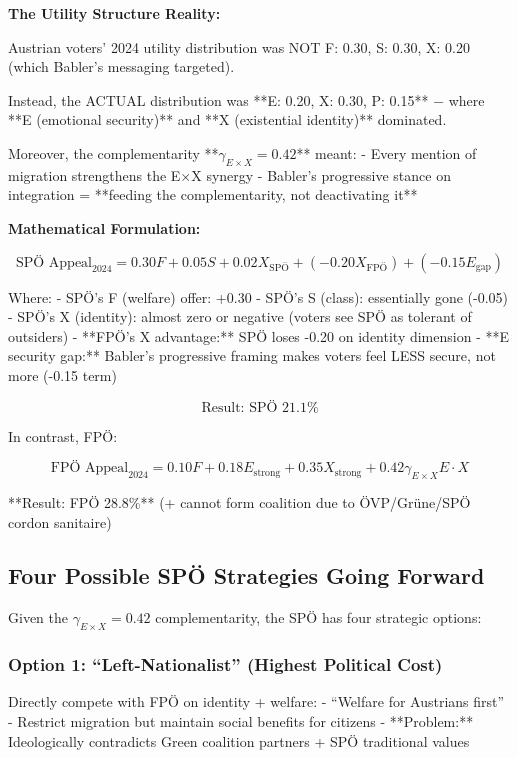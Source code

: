 \textbf{The Utility Structure Reality:}

Austrian voters' 2024 utility distribution was NOT {F: 0.30, S: 0.30, X: 0.20} (which Babler's messaging targeted).

Instead, the ACTUAL distribution was {**E: 0.20, X: 0.30, P: 0.15**} − where **E (emotional security)** and **X (existential identity)** dominated.

Moreover, the complementarity **$\gamma_{E \times X} = 0.42$** meant:
- Every mention of migration strengthens the E×X synergy
- Babler's progressive stance on integration = **feeding the complementarity, not deactivating it**

\textbf{Mathematical Formulation:}

$$\text{SPÖ Appeal}_{2024} = 0.30 F + 0.05 S + 0.02 X_{\text{SPÖ}} + (-0.20 X_{\text{FPÖ}}) + (-0.15 E_{\text{gap}})$$

Where:
- SPÖ's F (welfare) offer: +0.30
- SPÖ's S (class): essentially gone (-0.05)
- SPÖ's X (identity): almost zero or negative (voters see SPÖ as tolerant of outsiders)
- **FPÖ's X advantage:** SPÖ loses -0.20 on identity dimension
- **E security gap:** Babler's progressive framing makes voters feel LESS secure, not more (-0.15 term)

$$\text{Result: SPÖ 21.1\%}$$

In contrast, FPÖ:

$$\text{FPÖ Appeal}_{2024} = 0.10 F + 0.18 E_{\text{strong}} + 0.35 X_{\text{strong}} + 0.42 \gamma_{E \times X} E \cdot X$$

**Result: FPÖ 28.8\%** (+ cannot form coalition due to ÖVP/Grüne/SPÖ cordon sanitaire)

\subsection{Four Possible SPÖ Strategies Going Forward}

Given the $\gamma_{E \times X} = 0.42$ complementarity, the SPÖ has four strategic options:

\subsubsection{Option 1: ``Left-Nationalist'' (Highest Political Cost)}

Directly compete with FPÖ on identity + welfare:
- ``Welfare for Austrians first''
- Restrict migration but maintain social benefits for citizens
- **Problem:** Ideologically contradicts Green coalition partners + SPÖ traditional values

